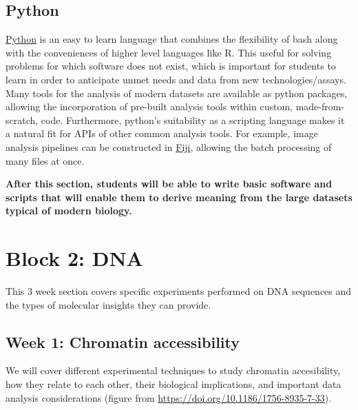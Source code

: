 \documentclass[]{book}
\begin{document}
\hypertarget{python}{%
\section{Python}\label{python}}

\href{https://www.python.org/}{Python} is an easy to learn language that combines the flexibility of bash along with the conveniences of higher level languages like R. This useful for solving problems for which software does not exist, which is important for students to learn in order to anticipate unmet needs and data from new technologies/assays. Many tools for the analysis of modern datasets are available as python packages, allowing the incorporation of pre-built analysis tools within custom, made-from-scratch, code. Furthermore, python's suitability as a scripting language makes it a natural fit for APIs of other common analysis tools. For example, image analysis pipelines can be constructed in \href{https://imagej.net/Jython_Scripting}{Fiji}, allowing the batch processing of many files at once.

\textbf{After this section, students will be able to write basic software and scripts that will enable them to derive meaning from the large datasets typical of modern biology.}

\hypertarget{block-dna}{%
\chapter{Block 2: DNA}\label{block-dna}}

This 3 week section covers specific experiments performed on DNA sequences and the types of molecular insights they can provide.

\hypertarget{week-1-chromatin-accessibility}{%
\section{Week 1: Chromatin accessibility}\label{week-1-chromatin-accessibility}}

We will cover different experimental techniques to study chromatin accesibility, how they relate to each other, their biological implications, and important data analysis considerations (figure from \url{https://doi.org/10.1186/1756-8935-7-33}).
\end{document}
